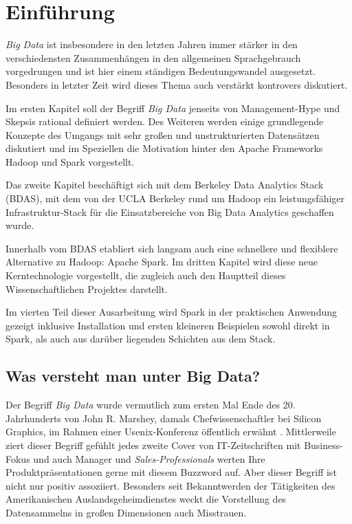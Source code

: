 \chapter{Einführung}
\label{chapter:einfuehrung}

\textit{Big Data} ist insbesondere in den letzten Jahren immer stärker in den verschiedensten Zusammenhängen in den allgemeinen Sprachgebrauch vorgedrungen und ist hier einem ständigen Bedeutungswandel ausgesetzt. Besonders in letzter Zeit wird dieses Thema auch verstärkt kontrovers diskutiert.  

Im ersten Kapitel soll der Begriff \textit{Big Data} jenseits von Management-Hype und Skepsis rational definiert werden. Des Weiteren werden einige grundlegende Konzepte des Umgangs mit sehr großen und unstrukturierten Datensätzen diskutiert und im Speziellen die Motivation hinter den Apache Frameworks Hadoop und Spark vorgestellt.  

Das zweite Kapitel beschäftigt sich mit dem Berkeley Data Analytics Stack (BDAS), mit dem von der UCLA Berkeley rund um Hadoop ein leistungsfähiger Infrastruktur-Stack für die Einsatzbereiche von Big Data Analytics geschaffen wurde. 

Innerhalb vom BDAS etabliert sich langsam auch eine schnellere und flexiblere Alternative zu Hadoop: Apache Spark. Im dritten Kapitel wird diese neue Kerntechnologie vorgestellt, die zugleich auch den Hauptteil dieses Wissenschaftlichen Projektes darstellt. 

Im vierten Teil dieser Ausarbeitung wird Spark in der praktischen Anwendung gezeigt inklusive Installation und ersten kleineren Beispielen sowohl direkt in Spark, als auch aus darüber liegenden Schichten aus dem Stack. 

\section{Was versteht man unter Big Data?}
\label{section:was versteht man unter Big Data?}


Der Begriff \textit{Big Data} wurde vermutlich zum ersten Mal Ende des 20. Jahrhunderts von John R. Marshey, damals Chefwissenschaftler bei Silicon Graphics, im Rahmen einer Usenix-Konferenz öffentlich erwähnt . Mittlerweile ziert dieser Begriff gefühlt jedes zweite Cover von IT-Zeitschriften mit Business-Fokus und auch Manager und \textit{Sales-Professionals} werten Ihre Produktpräsentationen gerne mit diesem Buzzword auf.  Aber dieser Begriff ist nicht nur positiv assoziiert. Besonders seit Bekanntwerden der Tätigkeiten des Amerikanischen Auslandsgeheimdienstes weckt die Vorstellung des Datensammelns in großen Dimensionen auch Misstrauen. 

